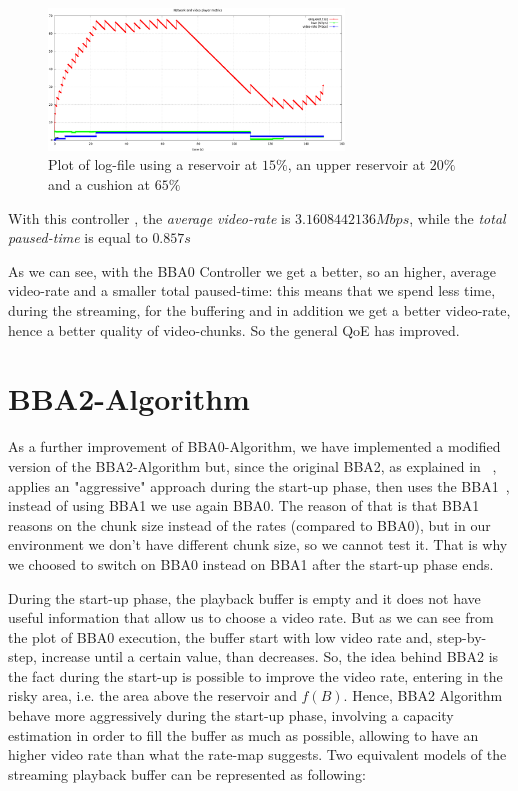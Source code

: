 \documentclass[a4paper]{report}
\begin{document}
\begin{figure}[H]
  \begin{center}
    \includegraphics[width=0.7\textwidth]{res_fifteen_cushion_sixtyfive}
  \end{center}
  \caption{Plot of log-file using a reservoir at $15\%$, an upper reservoir at $20\%$ and a cushion at $65\%$}\label{bba0-2}
\end{figure}

With this controller , the \textit{average video-rate} is $3.1608442136 Mbps$, while the \textit{total paused-time} is equal to $0.857 s$

As we can see, with the BBA0 Controller we get a better, so an higher, average video-rate  and a smaller total paused-time: this means that we spend less time, during the streaming, for the buffering and in addition we get a better video-rate, hence a better quality of video-chunks. So the general QoE has improved.

\section{BBA2-Algorithm}
As a further improvement of BBA0-Algorithm, we have implemented a modified version of the BBA2-Algorithm but, since the original BBA2, as explained in ~\cite{Huang:2014:BAR:2740070.2626296}, applies an "aggressive" approach during the start-up phase, then uses the BBA1~\cite{Huang:2014:BAR:2740070.2626296}, instead of using BBA1  we use again BBA0. The reason of that is that BBA1 reasons on the chunk size instead of the rates (compared to BBA0), but in our environment we don't have different chunk size, so we cannot test it. That is why we choosed to switch on BBA0 instead on BBA1 after the start-up phase ends.

During the start-up phase, the playback buffer is empty and it does not have useful information that allow us to choose a video rate. But as we can see from the plot of BBA0 execution, the buffer start with low video rate and, step-by-step, increase until a certain value, than decreases. So, the idea behind BBA2 is the fact during the start-up is possible to improve the video rate, entering in the risky area, i.e. the area above the reservoir and $f(B)$. Hence, BBA2 Algorithm behave more aggressively during the start-up phase, involving a capacity estimation in order to fill the buffer as much as possible, allowing to have an higher video rate than what the rate-map suggests.
Two equivalent models of the streaming playback buffer can be represented as following:
\end{document}
